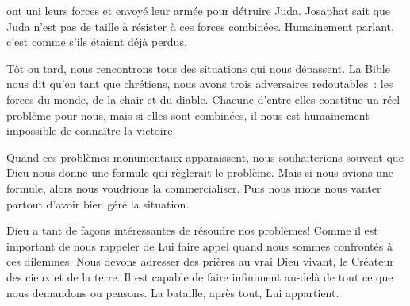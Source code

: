 
 ont uni leurs forces et envoyé
 leur armée pour détruire Juda. Josaphat sait que Juda n'est pas de taille
 à résister à ces forces combinées.
 Humainement parlant, c'est comme s'ils étaient déjà perdus. 

Tôt ou tard, nous rencontrons tous des situations qui nous dépassent.
 La Bible nous dit qu'en tant que chrétiens,
 nous avons trois adversaires redoutables~: les forces du monde,
 de la chair et du diable. Chacune d'entre elles constitue un réel problème
 pour nous, mais si elles sont combinées, il nous est humainement impossible
 de connaître la victoire. 


Quand ces problèmes monumentaux apparaissent, nous souhaiterions souvent
 que Dieu nous donne une formule qui règlerait le problème.
 Mais si nous avions une formule, alors nous voudrions la commercialiser.
 Puis nous irions nous vanter partout d'avoir bien géré la situation. 

Dieu a tant de façons intéressantes de résoudre nos problèmes!
 Comme il est important de nous rappeler de Lui faire appel quand nous sommes
 confrontés à ces dilemmes. Nous devons adresser des prières
 au vrai Dieu vivant, le Créateur des cieux et de la terre.
 Il est capable de faire infiniment au-delà de tout ce que nous demandons
 ou pensons. La bataille, après tout, Lui appartient. 

\dvrule






